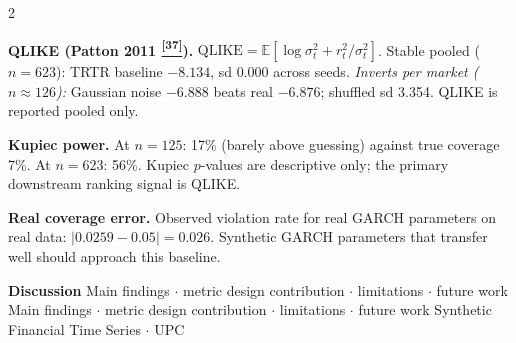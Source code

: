 \documentclass[10pt]{article}
\newcommand{\pagehead}[2]{%
  \begin{tcolorbox}[enhanced,arc=0pt,outer arc=0pt,boxrule=0pt,
    colback=Navy,colframe=Navy,
    top=5pt,bottom=5pt,left=8pt,right=8pt,
    before skip=0pt,after skip=10pt]
  {\color{white}\large\bfseries #1}%
  \ifx\relax#2\relax\else\\[1pt]{\color{blue!30!white}\small #2}\fi
  \hfill{\color{blue!20!white}\footnotesize Synthetic Financial Time Series $\cdot$ UPC}
  \end{tcolorbox}}
\newcommand{\tcite}[1]{%
  \hyperlink{R:#1}{\textsuperscript{\scriptsize\textbf{[#1]}}}}
\newcommand{\E}{\mathbb{E}}
\begin{document}
\begin{multicols}{2}
{\textbf{QLIKE (Patton 2011\tcite{37}).} $\text{QLIKE} = \E[\log\sigma_t^2 + r_t^2/\sigma_t^2]$. Stable pooled ($n=623$): TRTR baseline $-8.134$, sd 0.000 across seeds. \textit{Inverts per market ($n\approx126$):} Gaussian noise $-6.888$ beats real $-6.876$; shuffled sd 3.354. QLIKE is reported pooled only.

\textbf{Kupiec power.} At $n=125$: 17\% (barely above guessing) against true coverage 7\%. At $n=623$: 56\%. Kupiec $p$-values are descriptive only; the primary downstream ranking signal is QLIKE.

\textbf{Real coverage error.} Observed violation rate for real GARCH parameters on real data: $|0.0259 - 0.05| = 0.026$. Synthetic GARCH parameters that transfer well should approach this baseline.}

\end{multicols}

\clearpage

\pagehead{Discussion}
         {Main findings $\cdot$ metric design contribution $\cdot$ limitations $\cdot$ future work}
\end{document}
